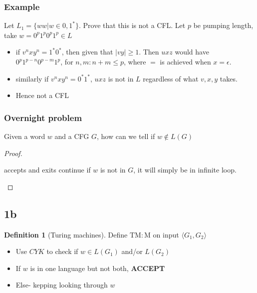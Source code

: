 \documentclass{article}
\newcommand{\tb}[1]{\textbf{#1}}
\newcommand{\mr}[1]{\mathrm{#1}}
\theoremstyle{definition}
\newtheorem{definition}{Definition}[section]
\theoremstyle{remark}
\begin{document}
\subsubsection*{Example}
Let $L_1 = \{ww | w \in {0,1}^*\}$. Prove that this is not a CFL. Let $p$ be pumping length, take $w = 0^p1^p0^p1^p \in L$
\begin{itemize}
    \item if $v^nxy^n = 1^*0^*$, then given that $|vy| \geq 1$. Then $uxz$ would have $0^p1^{p-n}0^{p-m}1^p$, for $n, m : n + m \leq p$, where $=$ is achieved when $x = \epsilon$.
    \item similarly if $v^nxy^n = 0^*1^*$, $uxz$ is not in $L$ regardless of what $v, x, y$ takes.
    \item Hence not a CFL
\end{itemize}

\subsubsection*{Overnight problem}
Given a word $w$ and a CFG $G$, how can we tell if $w \notin L(G)$
\begin{proof}
    \begin{algorithmic}
                accepts and exits
                \Return
            \Else
                continue
                if $w$ is not in $G$, it will simply be in infinite loop.
            \EndIf
        \EndWhile
    \end{algorithmic}
\end{proof}

\subsection{1b}
\begin{definition}[Turing machines]
    Define $\mr{TM : M}$ on input $\langle G_1, G_2 \rangle$
\end{definition}

\begin{itemize}
    \item Use $CYK$ to check if $w \in L(G_1)$ and/or $L(G_2)$
    \item If $w$ is in one language but not both, \tb{ACCEPT}
    \item Else- kepping looking through $w$
\end{itemize}
\end{document}
